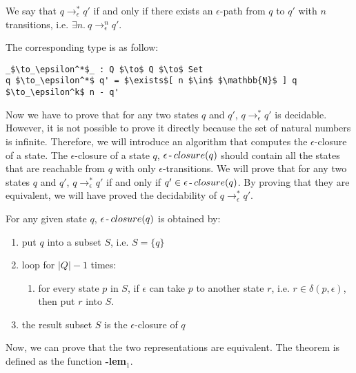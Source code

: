 \begin{defn}
\noindent We say that \(q \to_\epsilon^* q'\) if and only if there
exists an \(\epsilon\)-path from \(q\) to \(q'\) with \(n\) transitions, i.e. \(\exists n.\ q \to_\epsilon^n q'\). 
\end{defn}

\par The corresponding type is as follow: 
\begin{lstlisting}[mathescape=true,xleftmargin=.3\textwidth]
_$\to_\epsilon^*$_ : Q $\to$ Q $\to$ Set
q $\to_\epsilon^*$ q' = $\exists$[ n $\in$ $\mathbb{N}$ ] q $\to_\epsilon^k$ n - q'
\end{lstlisting}

\par Now we have to prove that for any two states \(q\) and \(q'\), 
\(q \to_\epsilon^* q'\) is decidable. However, it is not possible to
prove it directly because the set of natural numbers is
infinite. Therefore, we will introduce an algorithm that computes the
\(\epsilon\)-closure of a state. The \(\epsilon\)-closure of a state
\(q\), \(\epsilon\operatorname{-} closure(q)\) should contain all the states
that are reachable from \(q\) with only \(\epsilon\)-transitions. We will prove that for any two states
\(q\) and \(q'\), \(q \to_\epsilon^* q'\) if and only if \(q' \in \epsilon\operatorname{-} closure(q)\). By proving that they are equivalent, we
will have proved the decidability of \(q \to_\epsilon^* q'\). 

\begin{defn}
\noindent For any given state \(q\), \(\epsilon\operatorname{-} closure(q)\) is obtained by: 
\begin{enumerate}[nolistsep]
  \item put \(q\) into a subset \(S\), i.e. \(S = \{q\}\)
  \item loop for \(|Q| - 1\) times: 
  \begin{enumerate}
    \item for every state \(p\) in \(S\), if \(\epsilon\) can take
      \(p\) to another state \(r\), i.e. \(r \in
        \delta (p,\epsilon)\), then put \(r\) into \(S\). 
  \end{enumerate}
  \item the result subset \(S\) is the \(\epsilon\)-closure of \(q\)
\end{enumerate}
\end{defn}

\par Now, we can prove that the two representations are equivalent. The
theorem is defined as the function \mmb{\to_\epsilon^*\!}\textbf{-lem\(_1\)}. 

